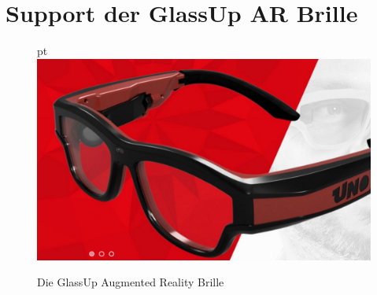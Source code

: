 \section{Support der GlassUp AR Brille}
\begin{figure}{\linewidth pt}
	\includegraphics[width=\linewidth]{../images/glassUpGlasses.JPG}
	\caption{Die GlassUp Augmented Reality Brille\cite{home}}
	\label{fig:GlassUpGlasses}
\end{figure}
